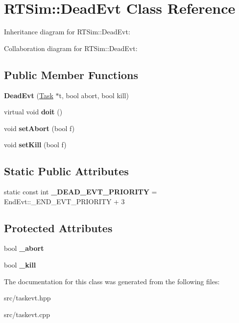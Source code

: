 \hypertarget{classRTSim_1_1DeadEvt}{}\section{R\+T\+Sim\+:\+:Dead\+Evt Class Reference}
\label{classRTSim_1_1DeadEvt}


Inheritance diagram for R\+T\+Sim\+:\+:Dead\+Evt\+:


Collaboration diagram for R\+T\+Sim\+:\+:Dead\+Evt\+:
\subsection*{Public Member Functions}
\begin{DoxyCompactItemize}
\item 
{\bfseries Dead\+Evt} (\hyperlink{classRTSim_1_1Task}{Task} $\ast$t, bool abort, bool kill)
\item 
virtual void {\bfseries doit} ()
\item 
void {\bfseries set\+Abort} (bool f)
\item 
void {\bfseries set\+Kill} (bool f)
\end{DoxyCompactItemize}
\subsection*{Static Public Attributes}
\begin{DoxyCompactItemize}
\item 
static const int {\bfseries \+\_\+\+D\+E\+A\+D\+\_\+\+E\+V\+T\+\_\+\+P\+R\+I\+O\+R\+I\+TY} = End\+Evt\+::\+\_\+\+E\+N\+D\+\_\+\+E\+V\+T\+\_\+\+P\+R\+I\+O\+R\+I\+TY + 3
\end{DoxyCompactItemize}
\subsection*{Protected Attributes}
\begin{DoxyCompactItemize}
\item 
bool {\bfseries \+\_\+abort}
\item 
bool {\bfseries \+\_\+kill}
\end{DoxyCompactItemize}


The documentation for this class was generated from the following files\+:\begin{DoxyCompactItemize}
\item 
src/taskevt.\+hpp\item 
src/taskevt.\+cpp\end{DoxyCompactItemize}
